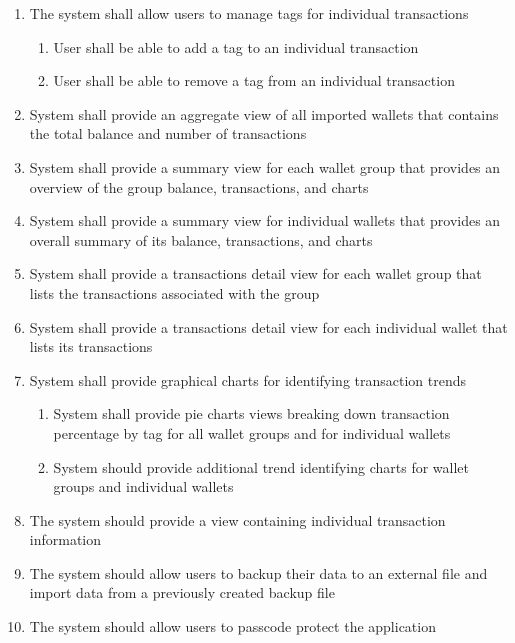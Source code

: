 \begin{adjustwidth}{1.5em}{0pt}
\begin{enumerate}
		\item The system shall allow users to manage tags for individual transactions
		\begin{enumerate}
			\item User shall be able to add a tag to an individual transaction
			\item User shall be able to remove a tag from an individual transaction
		\end{enumerate}

		\item System shall provide an aggregate view of all imported wallets that contains the total balance and number of transactions
		
		\item System shall provide a summary view for each wallet group that provides an overview of the group balance, transactions, and charts
		
		\item System shall provide a summary view for individual wallets that provides an overall summary of its balance, transactions, and charts
		
		\item System shall provide a transactions detail view for each wallet group that lists the transactions associated with the group
				
		\item System shall provide a transactions detail view for each individual wallet that lists its transactions
		
		\item System shall provide graphical charts for identifying transaction trends
		\begin{enumerate}
			\item System shall provide pie charts views breaking down transaction percentage by tag for all wallet groups and for individual wallets
			\item System should provide additional trend identifying charts for wallet groups and individual wallets
		\end{enumerate}
		
		\item The system should provide a view containing individual transaction information
		
		\item The system should allow users to backup their data to an external file and import data from a previously created backup file
		
		\item The system should allow users to passcode protect the application
		
	\end{enumerate}

	
\end{adjustwidth}
